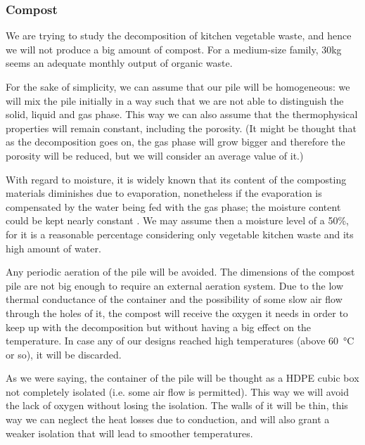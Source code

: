 \documentclass[12pt, a4paper, twocolumn]{article}
\numberwithin{table}{section}
\numberwithin{figure}{section}
\numberwithin{equation}{section}
\begin{document}
\subsubsection{Compost}

We are trying to study the decomposition of kitchen vegetable waste, and hence we will not produce a big amount of compost. For a medium-size family, \si{30}{kg} seems an adequate monthly output of organic waste. 

For the sake of simplicity, we can assume that our pile will be homogeneous: we will mix the pile initially in a way such that we are not able to distinguish the solid, liquid and gas phase. This way we can also assume that the thermophysical properties will remain constant, including the porosity. (It might be thought that as the decomposition goes on, the gas phase will grow bigger and therefore the porosity will be reduced, but we will consider an average value of it.) %

With regard to moisture, it is widely known that its content of the composting materials diminishes due to evaporation, nonetheless if the evaporation is compensated by the water being fed with the gas phase; the moisture content could be kept nearly constant \cite{niceassumptions}. We may assume then a moisture level of a 50\%, for it is a reasonable percentage considering only vegetable kitchen waste and its high amount of water. 

Any periodic aeration of the pile will be avoided. The dimensions of the compost pile are not big enough to require an external aeration system. Due to the low thermal conductance of the container and the possibility of some slow air flow through the holes of it, the compost will receive the oxygen it needs in order to keep up with the decomposition but without having a big effect on the temperature. In case any of our designs reached high temperatures (above \SI{60}{\celsius} or so), it will be discarded. 

As we were saying, the container of the pile will be thought as a HDPE cubic box not completely isolated (i.e. some air flow is permitted). This way we will avoid the lack of oxygen without losing the isolation. The walls of it will be thin, this way we can neglect the heat losses due to conduction, and will also grant a weaker isolation that will lead to smoother temperatures. 
\end{document}
